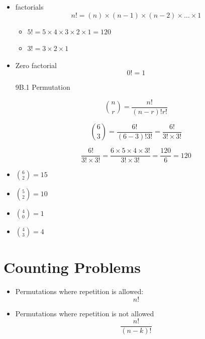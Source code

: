 \documentclass[12pt]{report}
\begin{document}
			\begin{itemize}
				\item factorials 
				\[ n! = (n)\times (n-1)\times(n-2) \times \ldots \times 1 \]
				\begin{itemize}
					\item $5! = 5 \times 4 \times 3 \times 2 \times 1 = 120 $
					\item $3! = 3 \times 2 \times 1$
				\end{itemize}
				\item Zero factorial
				\[ 0! =  1 \]
			\end{itemize}
	
	\begin{itemize}
		\item[9B.1] Permutation
		
		\[ {n \choose r} = \frac{n!}{(n-r)! r!} \]
		
		
		\[ {6 \choose 3} = \frac{6!}{(6-3)! 3!} = \frac{6!}{3! \times 3!}\]
		
		
		\[ \frac{6!}{3! \times 3!} = \frac{6 \times 5 \times 4 \times 3!}{3! \times 3!} = \frac{120}{6} = 120\]
	\end{itemize}
	
	\begin{itemize}
		\item ${6 \choose 2} = 15$
		\item ${5 \choose 2} = 10$  
		\item ${4 \choose 0} = 1$  
		\item ${4 \choose 3} = 4$  
	\end{itemize}
	
		
		\section{Counting Problems}
		\large
		\begin{itemize}
			\item Permutations where repetition is allowed: 
			\[ n! \]
			\item Permutations where repetition is not allowed
			\[ \frac{n!}{(n-k)!} \]
		\end{itemize}
		
		
		
\end{document}
